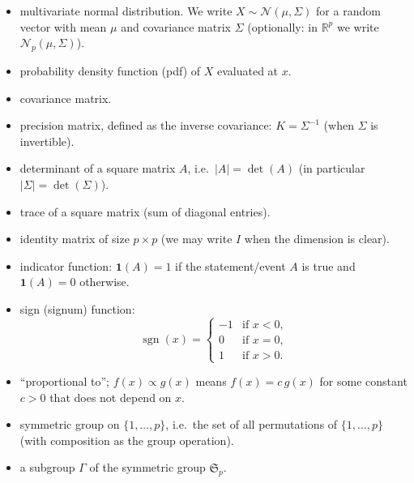 \documentclass[a4paper,11pt,twoside]{report}
\theoremstyle{definition}
\begin{document}
\begin{itemize}
  \item[$\mathcal N(\mu,\Sigma)$] multivariate normal distribution.
  We write $X\sim \mathcal N(\mu,\Sigma)$ for a random vector with mean $\mu$ and covariance matrix $\Sigma$
  (optionally: in $\mathbb R^p$ we write $\mathcal N_p(\mu,\Sigma)$).

  \item[$f_X(x)$] probability density function (pdf) of $X$ evaluated at $x$.

  \item[$\Sigma$] covariance matrix.

  \item[$K$] precision matrix, defined as the inverse covariance: $K=\Sigma^{-1}$ (when $\Sigma$ is invertible).

  \item[$|A|$] determinant of a square matrix $A$, i.e.\ $|A|=\det(A)$ (in particular $|\Sigma|=\det(\Sigma)$).

  \item[$\operatorname{tr}(\cdot)$] trace of a square matrix (sum of diagonal entries).

  \item[$I_p$] identity matrix of size $p\times p$ (we may write $I$ when the dimension is clear).

  \item[$\mathbf 1(\cdot)$] indicator function: $\mathbf 1(A)=1$ if the statement/event $A$ is true and
  $\mathbf 1(A)=0$ otherwise.

  \item[$\operatorname{sgn}(\cdot)$] sign (signum) function:
  \[
    \operatorname{sgn}(x)=
    \begin{cases}
      -1 & \text{if } x<0,\\
      0  & \text{if } x=0,\\
      1  & \text{if } x>0.
    \end{cases}
  \]

  \item[$\propto$] “proportional to”; $f(x)\propto g(x)$ means $f(x)=c\,g(x)$ for some constant $c>0$
  that does not depend on $x$.

  \item[$\mathfrak{S}_p$] symmetric group on $\{1,\ldots,p\}$, i.e.\ the set of all permutations of $\{1,\ldots,p\}$
  (with composition as the group operation).

  \item[$\Gamma \le \mathfrak{S}_p$] a subgroup $\Gamma$ of the symmetric group $\mathfrak{S}_p$.

\end{itemize}
\thispagestyle{empty}
\end{document}
